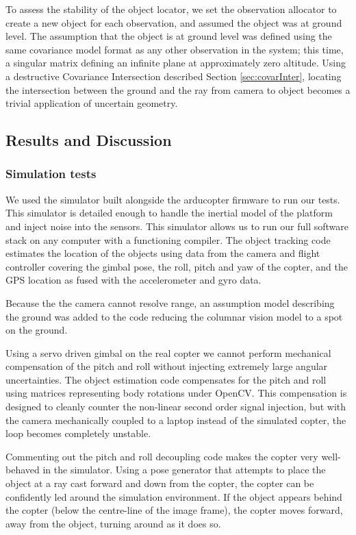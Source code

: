 \documentclass{article}
\begin{document}
      To assess the stability of the object locator, we set the observation allocator to create a new object for each observation, and assumed the object was at ground level.
      The assumption that the object is at ground level was defined using the same covariance model format as any other observation in the system; this time, a singular matrix defining an infinite plane at approximately zero altitude.
      Using a destructive Covariance Intersection described Section \ref{sec:covarInter}, locating the intersection between the ground and the ray from camera to object becomes a trivial application of uncertain geometry.

  \subsection{Results and Discussion}

    \subsubsection{Simulation tests}
      We used the simulator built alongside the arducopter firmware to run our tests.  This simulator is detailed enough to handle the inertial model of the platform and inject noise into the sensors.
      This simulator allows us to run our full software stack on any computer with a functioning compiler.
      The object tracking code estimates the location of the objects using data from the camera and flight controller covering the gimbal pose, the roll, pitch and yaw of the copter, and the GPS location as fused with the accelerometer and gyro data.

      Because the the camera cannot resolve range, an assumption model describing the ground was added to the code reducing the columnar vision model to a spot on the ground.

      Using a servo driven gimbal on the real copter we cannot perform mechanical compensation of the pitch and roll without injecting extremely large angular uncertainties.
      The object estimation code compensates for the pitch and roll using matrices representing body rotations under OpenCV.
      This compensation is designed to cleanly counter the non-linear second order signal injection, but with the camera mechanically coupled to a laptop instead of the simulated copter, the loop becomes completely unstable.

      Commenting out the pitch and roll decoupling code makes the copter very well-behaved in the simulator.  Using a pose generator that attempts to place the object at a ray cast forward and down from the copter, the copter can be confidently led around the simulation environment.  If the object appears behind the copter (below the centre-line of the image frame), the copter moves forward, away from the object, turning around as it does so.
\end{document}
